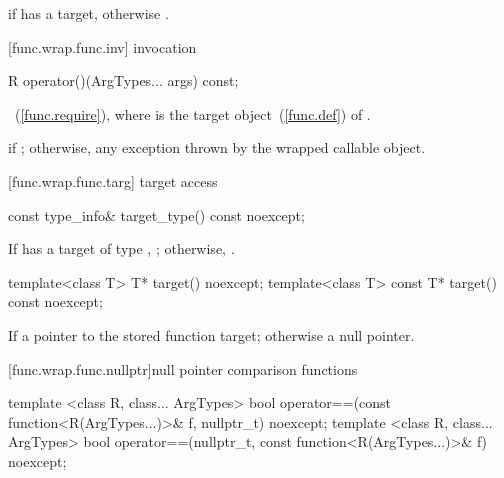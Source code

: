 \begin{itemdescr}
\pnum
\returns {} if  has a target, otherwise .
\end{itemdescr}

[func.wrap.func.inv]{ invocation}

%
%
\begin{itemdecl}
R operator()(ArgTypes... args) const;
\end{itemdecl}

\begin{itemdescr}
\pnum
\returns {}~(\ref{func.require}),
where  is the target object~(\ref{func.def}) of .

\pnum\throws
{} if ; otherwise, any
exception thrown by the wrapped callable object.
\end{itemdescr}

[func.wrap.func.targ]{ target access}

%
\begin{itemdecl}
const type_info& target_type() const noexcept;
\end{itemdecl}

\begin{itemdescr}
\pnum\returns If  has a target of type ,
  ; otherwise, .
\end{itemdescr}

%
\begin{itemdecl}
template<class T>       T* target() noexcept;
template<class T> const T* target() const noexcept;
\end{itemdecl}

\begin{itemdescr}
\pnum\returns If 
a pointer to the stored function target; otherwise a null pointer.
\end{itemdescr}

[func.wrap.func.nullptr]{null pointer comparison functions}

%
\begin{itemdecl}
template <class R, class... ArgTypes>
  bool operator==(const function<R(ArgTypes...)>& f, nullptr_t) noexcept;
template <class R, class... ArgTypes>
  bool operator==(nullptr_t, const function<R(ArgTypes...)>& f) noexcept;
\end{itemdecl}

